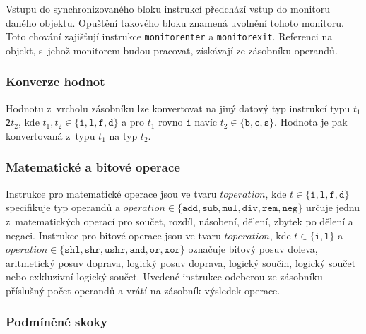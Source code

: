 
Vstupu do synchronizovaného bloku instrukcí předchází vstup do monitoru daného objektu. Opuštění takového bloku znamená uvolnění tohoto monitoru. Toto chování zajišťují instrukce \texttt{monitorenter} a \texttt{monitorexit}. Referenci na objekt, s~jehož monitorem budou pracovat, získávají ze zásobníku operandů.

\subsubsection{Konverze hodnot}

Hodnotu z~vrcholu zásobníku lze konvertovat na jiný datový typ instrukcí typu $t_1$\texttt{2}$t_2$, kde $t_1, t_2 \in \{\texttt{i}, \texttt{l},\texttt{f},\texttt{d}\}$ a pro $t_1$ rovno $\texttt{i}$ navíc $t_2 \in \{\texttt{b}, \texttt{c},\texttt{s}\}$. Hodnota je pak konvertovaná z~typu $t_1$ na typ $t_2$.

\subsubsection{Matematické a bitové operace}

Instrukce pro matematické operace jsou ve tvaru $t operation$, 
kde $t \in \{\texttt{i}, \texttt{l}, \texttt{f}, \texttt{d} \}$ specifikuje typ operandů 
a $operation \in \{\texttt{add},\texttt{sub}, \texttt{mul}, \texttt{div}, \texttt{rem}, \texttt{neg} \}$ určuje jednu z~matematických operací pro součet, rozdíl, násobení, dělení, zbytek po dělení a negaci. 
Instrukce pro bitové operace jsou ve tvaru $t operation$, 
kde $t \in \{\texttt{i}, \texttt{l}\}$ 
a $operation \in \{\texttt{shl},\texttt{shr}, \texttt{ushr}, \texttt{and}, \texttt{or}, \texttt{xor}\}$ označuje bitový posuv doleva, aritmetický posuv doprava, logický posuv doprava, logický součin, logický součet nebo  exkluzivní logický součet. 
Uvedené instrukce odeberou ze zásobníku příslušný počet operandů a vrátí na zásobník výsledek operace.

\subsubsection{Podmíněné skoky}

